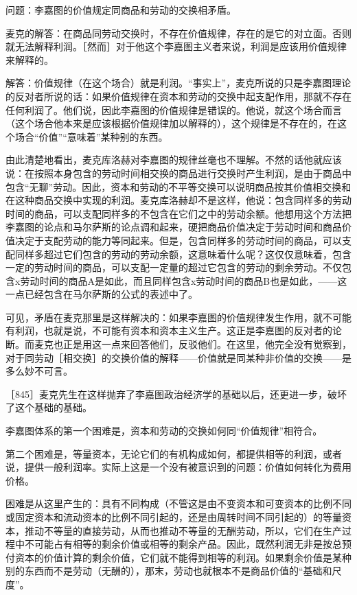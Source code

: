 问题：李嘉图的价值规定同商品和劳动的交换相矛盾。

麦克的解答：在商品同劳动交换时，不存在价值规律，存在的是它的对立面。否则就无法解释利润。［然而］对于他这个李嘉图主义者来说，利润是应该用价值规律来解释的。

解答：价值规律（在这个场合）就是利润。“事实上”，麦克所说的只是李嘉图理论的反对者所说的话：如果价值规律在资本和劳动的交换中起支配作用，那就不存在任何利润了。他们说，因此李嘉图的价值规律是错误的。他说，就这个场合而言（这个场合他本来是应该根据价值规律加以解释的），这个规律是不存在的，在这个场合“价值”“意味着”某种别的东西。

由此清楚地看出，麦克库洛赫对李嘉图的规律丝毫也不理解。不然的话他就应该说：在按照本身包含的劳动时间相交换的商品进行交换时产生利润，是由于商品中包含“无聊”劳动。因此，资本和劳动的不平等交换可以说明商品按其价值相交换和在这种商品交换中实现的利润。麦克库洛赫却不是这样，他说：包含同样多的劳动时间的商品，可以支配同样多的不包含在它们之中的劳动余额。他想用这个方法把李嘉图的论点和马尔萨斯的论点调和起来，硬把商品价值决定于劳动时间和商品价值决定于支配劳动的能力等同起来。但是，包含同样多的劳动时间的商品，可以支配同样多超过它们包含的劳动的劳动余额，这意味着什么呢？这仅仅意味着，包含一定的劳动时间的商品，可以支配一定量的超过它包含的劳动的剩余劳动。不仅包含x劳动时间的商品A是如此，而且同样包含x劳动时间的商品B也是如此，——这一点已经包含在马尔萨斯的公式的表述中了。

可见，矛盾在麦克那里是这样解决的：如果李嘉图的价值规律发生作用，就不可能有利润，也就是说，不可能有资本和资本主义生产。这正是李嘉图的反对者的论断。而麦克也正是用这一点来回答他们，反驳他们。在这里，他完全没有觉察到，对于同劳动［相交换］的交换价值的解释——价值就是同某种非价值的交换——是多么妙不可言。


［845］麦克先生在这样抛弃了李嘉图政治经济学的基础以后，还更进一步，破坏了这个基础的基础。

李嘉图体系的第一个困难是，资本和劳动的交换如何同“价值规律”相符合。

第二个困难是，等量资本，无论它们的有机构成如何，都提供相等的利润，或者说，提供一般利润率。实际上这是一个没有被意识到的问题：价值如何转化为费用价格。

困难是从这里产生的：具有不同构成（不管这是由不变资本和可变资本的比例不同或固定资本和流动资本的比例不同引起的，还是由周转时间不同引起的）的等量资本，推动不等量的直接劳动，从而也推动不等量的无酬劳动，所以，它们在生产过程中不可能占有相等的剩余价值或相等的剩余产品。因此，既然利润无非是按总预付资本的价值计算的剩余价值，它们就不能得到相等的利润。如果剩余价值是某种别的东西而不是劳动（无酬的），那末，劳动也就根本不是商品价值的“基础和尺度”。


